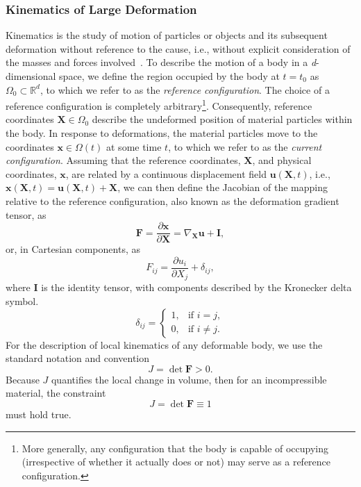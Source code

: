 \documentclass[a4paper,11pt]{article}
\begin{document}
\subsubsection{Kinematics of Large Deformation}
Kinematics is the study of motion of particles or objects and its subsequent deformation without reference to the cause, i.e., without explicit consideration of the masses and forces involved~\cite{bonet1997nonlinear}.  To describe the motion of a body in a \textit{d}-dimensional space, we define the region occupied by the body at $t=t_0$ as $\Omega_0 \subset \mathbb{R}^d$, to which we refer to as the \textit{reference configuration}. The choice of a reference configuration is completely arbitrary\footnote{More generally, any configuration that the body is capable of occupying (irrespective of whether it actually does or not) may serve as a reference configuration.}. Consequently, reference coordinates $\mathbf{X} \in \Omega_0$ describe the undeformed position of material particles within the body. In response to deformations, the material particles move to the coordinates $\mathbf{x} \in \Omega (t)$ at some time $t$, to which we refer to as the \textit{current configuration}.
Assuming that the reference coordinates, $\mathbf{X}$, and physical coordinates, $\mathbf{x}$, are related by a continuous displacement ﬁeld $\mathbf{u}(\mathbf{X},t)$, i.e., $\mathbf{x}(\mathbf{X},t) = \mathbf{u}(\mathbf{X},t) + \mathbf{X}$, we can then deﬁne the Jacobian of the mapping relative to the reference configuration, also known as the deformation gradient tensor, as
\begin{equation}
\mathbf{F}=\frac{\partial \mathbf{x}}{\partial \mathbf{X}} = \nabla_\mathbf{X}\mathbf{u} + \mathbf{I},
\end{equation}
or, in Cartesian components, as
\begin{equation}
F_{ij}=\frac{\partial u_i}{\partial X_j}+\delta_{ij},
\end{equation}
where $\mathbf{I}$ is the identity tensor, with components described by the Kronecker delta symbol. 
\begin{equation}
\delta_{ij} =
    \begin{cases}
            1, &         \text{if } i=j,\\
            0, &         \text{if } i\neq j.
    \end{cases}
\end{equation}
For the description of local kinematics of any deformable body, we use the standard notation and convention
\begin{equation}
J=\det \mathbf{F}>0.
\end{equation}
Because $J$ quantiﬁes the local change in volume, then for an incompressible material, the constraint 
\begin{equation}
J=\det \mathbf{F}\equiv 1
\end{equation}
must hold true. 
\end{document}
